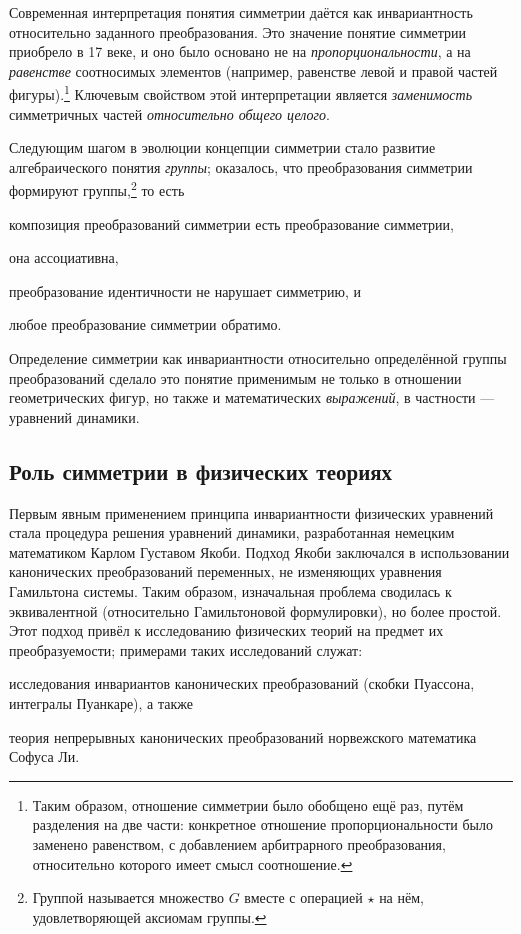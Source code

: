 \documentclass[14pt]{extarticle}
\begin{document}
Современная интерпретация понятия симметрии даётся как инвариантность относительно заданного преобразования. Это значение понятие симметрии приобрело в 17 веке, и оно было основано не на \emph{пропорциональности}, а на \emph{равенстве} соотносимых элементов (например, равенстве левой и правой частей фигуры).\footnote{Таким образом, отношение симметрии было обобщено ещё раз, путём разделения на две части: конкретное отношение пропорциональности было заменено равенством, с добавлением арбитрарного преобразования, относительно которого имеет смысл соотношение.} Ключевым свойством этой интерпретации является \emph{заменимость} симметричных частей \emph{относительно общего целого}.

Следующим шагом в эволюции концепции симметрии стало развитие алгебраического понятия \emph{группы}; оказалось, что преобразования симметрии формируют группы,\footnote{Группой называется множество $G$ вместе с операцией $\star$ на нём, удовлетворяющей аксиомам группы.} то есть 
\begin{inparaenum}[(1)]
	\item композиция преобразований симметрии есть преобразование симметрии,
	\item она ассоциативна,
	\item преобразование идентичности не нарушает симметрию, и
	\item любое преобразование симметрии обратимо.
\end{inparaenum}

Определение симметрии как инвариантности относительно определённой группы преобразований сделало это понятие применимым не только в отношении геометрических фигур, но также и математических \emph{выражений}, в частности --- уравнений динамики.~\cite{SEP.Symmetry}

\subsection{Роль симметрии в физических теориях}

Первым явным применением принципа инвариантности физических уравнений стала процедура решения уравнений динамики, разработанная немецким математиком Карлом Густавом Якоби. Подход Якоби заключался в использовании канонических преобразований переменных, не изменяющих уравнения Гамильтона системы. Таким образом, изначальная проблема сводилась к эквивалентной (относительно Гамильтоновой формулировки), но более простой. Этот подход привёл к исследованию физических теорий на предмет их преобразуемости; примерами таких исследований служат:
\begin{inparaenum}[(i)]
	\item исследования инвариантов канонических преобразований (скобки Пуассона, интегралы Пуанкаре), а также
	\item теория непрерывных канонических преобразований норвежского математика Софуса Ли.
\end{inparaenum}
\end{document}
